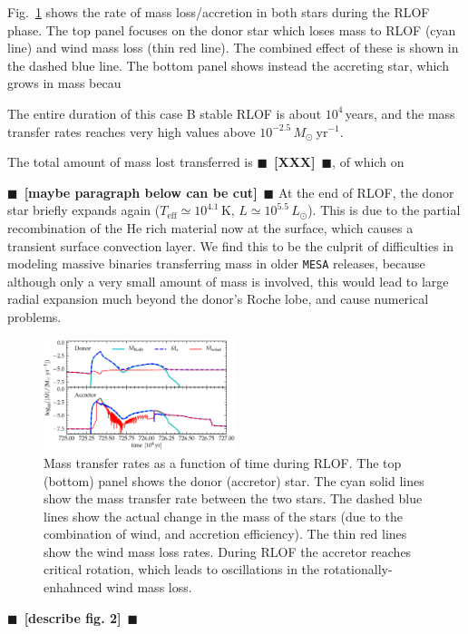 \documentclass[twocolumn,twocolappendix,trackchanges]{aastex63}
\DeclareRobustCommand{\Figref}[1]{Fig.~\ref{#1}}
\newcommand{\todo}[1]{{\large $\blacksquare$~\textbf{\color{red}[#1]}}~$\blacksquare$}
\begin{document}
\Figref{fig:MT} shows the rate of mass loss/accretion in both stars
during the RLOF phase. The top panel focuses on the donor star
which loses mass to RLOF (cyan line) and wind mass loss (thin red
line). The combined effect of these is shown in the dashed blue line.
The bottom panel shows instead the accreting star, which grows in mass becau


The entire duration of this case B stable RLOF
is about $10^4$\,years, and the mass transfer rates reaches very high
values above $10^{-2.5}\,M_\odot\ \mathrm{yr^{-1}}$.



The total amount
of mass lost transferred is \todo{XXX}, of which on

\todo{maybe paragraph below can be cut}
At the end of RLOF, the donor star briefly expands again
($T_\mathrm{eff}\simeq10^{4.1}$\,K, $L\simeq10^{5.5}\,L_\odot$). This
is due to the partial recombination of the He rich material now at the
surface, which causes a transient surface convection layer. We find
this to be the culprit of difficulties in modeling massive binaries
transferring mass in older \texttt{MESA} releases, because although
only a very small amount of mass is involved, this would lead to large
radial expansion much beyond the donor's Roche lobe, and cause
numerical problems.



\begin{figure}[htbp]
  \includegraphics[width=0.5\textwidth]{MT}
  \caption{Mass transfer rates as a function of time during RLOF. The top (bottom) panel
    shows the donor (accretor) star. The cyan solid lines show the
    mass transfer rate between the two stars. The dashed blue lines
    show the actual change in the mass of the stars (due to the
    combination of wind, and accretion efficiency). The thin red
    lines show the wind mass loss rates. During RLOF the accretor
    reaches critical rotation, which leads to oscillations in the
    rotationally-enhahnced wind mass loss.}
  \label{fig:MT}
\end{figure}


\todo{describe fig. 2}
\end{document}
